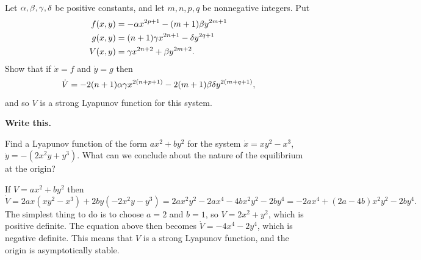 \documentclass[a4paper]{amsart}
\begin{document}
\begin{solution}
\begin{itemize}
\begin{center}
   \end{center}
 \end{itemize}
\end{solution}

\begin{exercise}\label{ex-lyapunov-binomial}
 Let $\alpha,\beta,\gamma,\delta$ be positive constants, and let $m,n,p,q$ be
 nonnegative integers.  Put 
 \begin{align*}
  f(x,y) &= -\alpha x^{2p+1} - (m+1)\beta y^{2m+1} \\
  g(x,y) &= (n+1)\gamma x^{2n+1} - \delta y^{2q+1} \\
  V(x,y) &= \gamma x^{2n+2} + \beta y^{2m+2}.
 \end{align*}
 Show that if $\dot{x}=f$ and $\dot{y}=g$ then  
 \[ \dot{V} = 
     -2(n+1)\alpha\gamma x^{2(n+p+1)}
     -2(m+1)\beta\delta y^{2(m+q+1)},
 \]
 and so $V$ is a strong Lyapunov function for this system.
\end{exercise}
\begin{solution}
 \textbf{Write this.}
\end{solution}

\begin{exercise}\label{ex-lyapunov-e}
 Find a Lyapunov function of the form $ax^2+by^2$ for the system
 $\dot{x}=xy^2-x^3$, $\dot{y}=-(2x^2y+y^3)$.  What can we conclude
 about the nature of the equilibrium at the origin?
\end{exercise}
\begin{solution}
 If $V=ax^2+by^2$ then
 \[ \dot{V} = 2ax(xy^2-x^3) + 2by(-2x^2y-y^3)
            = 2ax^2y^2 - 2ax^4 - 4bx^2y^2 - 2by^4 
            = -2ax^4 + (2a-4b)x^2y^2 - 2by^4.
 \]
 The simplest thing to do is to choose $a=2$ and $b=1$, so
 $V=2x^2+y^2$, which is positive definite.  The equation above then
 becomes $\dot{V}=-4x^4-2y^4$, which is negative definite.  This means
 that $V$ is a strong Lyapunov function, and the origin is
 asymptotically stable.
\end{solution}
\end{document}
